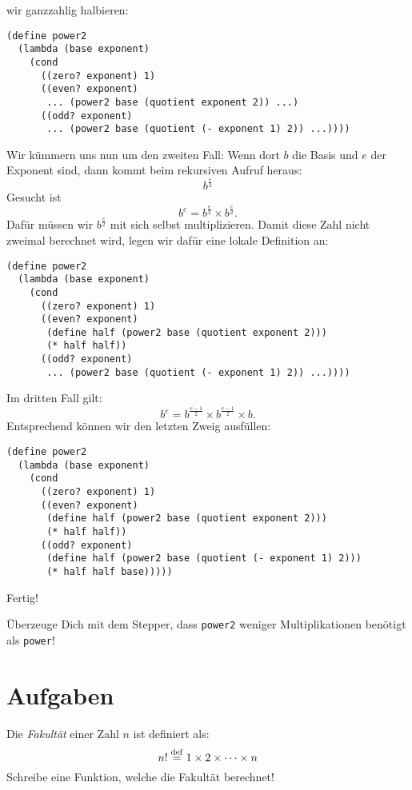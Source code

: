 wir ganzzahlig halbieren:
%
\begin{lstlisting}
(define power2
  (lambda (base exponent)
    (cond
      ((zero? exponent) 1)
      ((even? exponent)
       ... (power2 base (quotient exponent 2)) ...)
      ((odd? exponent)
       ... (power2 base (quotient (- exponent 1) 2)) ...))))
\end{lstlisting}
%
Wir kümmern uns nun um den zweiten Fall: Wenn dort $b$ die Basis und
$e$ der Exponent sind, dann kommt beim rekursiven Aufruf heraus:
%
\begin{displaymath}
  b^{\frac{e}{2}}
\end{displaymath}
%
Gesucht ist \[b^e = b^{\frac{e}{2}} \times b^{\frac{e}{2}}.\]
Dafür müssen wir $b^{\frac{e}{2}}$ mit sich selbst
multiplizieren. Damit diese Zahl
nicht zweimal berechnet wird, legen wir dafür eine lokale Definition an:
%
\begin{lstlisting}
(define power2
  (lambda (base exponent)
    (cond
      ((zero? exponent) 1)
      ((even? exponent)
       (define half (power2 base (quotient exponent 2)))
       (* half half))
      ((odd? exponent)
       ... (power2 base (quotient (- exponent 1) 2)) ...))))
\end{lstlisting}
%
Im dritten Fall gilt:
\begin{displaymath}
  b^e = b^{\frac{e-1}{2}} \times b^{\frac{e-1}{2}} \times b.
\end{displaymath}
%
Entsprechend können wir den letzten Zweig ausfüllen:
%
\begin{lstlisting}
(define power2
  (lambda (base exponent)
    (cond
      ((zero? exponent) 1)
      ((even? exponent)
       (define half (power2 base (quotient exponent 2)))
       (* half half))
      ((odd? exponent)
       (define half (power2 base (quotient (- exponent 1) 2)))
       (* half half base)))))
\end{lstlisting}
%
Fertig!
\begin{aufgabeinline}
  Überzeuge Dich mit dem Stepper, dass \lstinline{power2} weniger
  Multiplikationen benötigt als \lstinline{power}!
\end{aufgabeinline}

\newpage

\section*{Aufgaben}

\begin{aufgabe}
  Die \textit{Fakultät} einer Zahl $n$ ist definiert als:
  \begin{displaymath}
    n! \stackrel{\rm def}{=} 1 \times 2 \times \cdots \times n
  \end{displaymath}
  Schreibe eine Funktion, welche die Fakultät berechnet!
\end{aufgabe}

